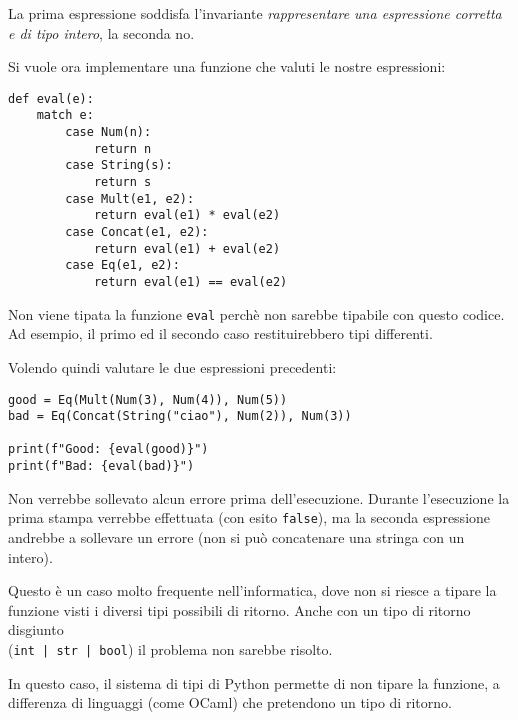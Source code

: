 \documentclass{article}
\begin{document}
La prima espressione soddisfa l'invariante \textit{rappresentare una espressione corretta e di tipo intero}, la seconda no.

Si vuole ora implementare una funzione che valuti le nostre espressioni:
\begin{tcolorbox}
\begin{verbatim}
def eval(e):
    match e:
        case Num(n):
            return n
        case String(s):
            return s
        case Mult(e1, e2):
            return eval(e1) * eval(e2)
        case Concat(e1, e2):
            return eval(e1) + eval(e2)
        case Eq(e1, e2):
            return eval(e1) == eval(e2)
\end{verbatim}
\end{tcolorbox}
Non viene tipata la funzione \texttt{eval} perchè non sarebbe tipabile con questo codice. Ad esempio, il primo ed il secondo caso restituirebbero tipi differenti.

Volendo quindi valutare le due espressioni precedenti:
\begin{tcolorbox}
\begin{verbatim}
good = Eq(Mult(Num(3), Num(4)), Num(5))
bad = Eq(Concat(String("ciao"), Num(2)), Num(3))

print(f"Good: {eval(good)}")
print(f"Bad: {eval(bad)}")
\end{verbatim}
\end{tcolorbox}
Non verrebbe sollevato alcun errore prima dell'esecuzione. Durante l'esecuzione la prima stampa verrebbe effettuata (con esito \texttt{false}), ma la seconda espressione andrebbe a sollevare un errore (non si può concatenare una stringa con un intero).

Questo è un caso molto frequente nell'informatica, dove non si riesce a tipare la funzione visti i diversi tipi possibili di ritorno. Anche con un tipo di ritorno disgiunto \\(\texttt{int | str | bool}) il problema non sarebbe risolto.

In questo caso, il sistema di tipi di Python permette di non tipare la funzione, a differenza di linguaggi (come OCaml) che pretendono un tipo di ritorno.
\end{document}
